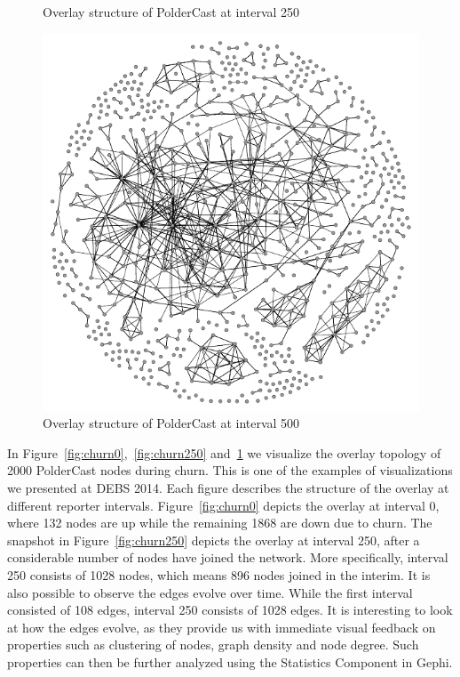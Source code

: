 \begin{figure}[H]
    \caption{Overlay structure  of PolderCast at interval 250}
    \label{fig:churn250}
    \includegraphics[scale=1]{figures/churn_500}
    \caption{Overlay structure of PolderCast at interval 500}
    \label{fig:churn500}
\end{figure}

In Figure~\ref{fig:churn0},~\ref{fig:churn250} and~\ref{fig:churn500} we
visualize the overlay topology of 2000 PolderCast nodes during churn.
This is one of the examples of visualizations we presented at DEBS 2014.
Each figure describes the structure of the overlay at different reporter
intervals. Figure~\ref{fig:churn0}
depicts the overlay at interval 0, where 132 nodes are up while the
remaining 1868 are down due to churn. The snapshot in
Figure~\ref{fig:churn250} depicts the overlay at interval 250, after a
considerable number of nodes have joined the network. More specifically,
interval 250 consists of 1028 nodes, which means 896 nodes joined in the
interim. It is also possible to observe the edges evolve over time. While the first interval consisted
of 108 edges, interval 250 consists of 1028 edges. It is interesting to
look at how the edges evolve, as they provide us with
immediate visual feedback on properties such as clustering of nodes,
graph density and node degree. Such properties can then be further
analyzed using the Statistics Component in Gephi.

